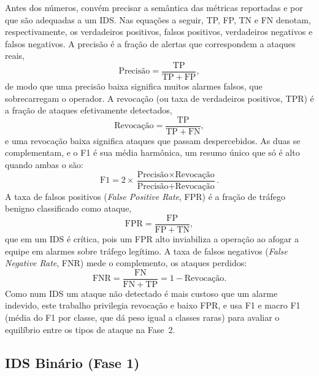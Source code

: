 \documentclass[12pt]{article}
\begin{document}
Antes dos números, convém precisar a semântica das métricas reportadas e por que
são adequadas a um IDS. Nas equações a seguir, TP, FP, TN e FN denotam,
respectivamente, os verdadeiros positivos, falsos positivos, verdadeiros
negativos e falsos negativos. A precisão é a fração de alertas que correspondem
a ataques reais,
\begin{equation}
\text{Precisão} = \frac{\mathrm{TP}}{\mathrm{TP} + \mathrm{FP}},
\label{eq:precisao}
\end{equation}
de modo que uma precisão baixa significa muitos alarmes falsos, que
sobrecarregam o operador. A revocação (ou taxa de verdadeiros positivos, TPR) é
a fração de ataques efetivamente detectados,
\begin{equation}
\text{Revocação} = \frac{\mathrm{TP}}{\mathrm{TP} + \mathrm{FN}},
\label{eq:revocacao}
\end{equation}
e uma revocação baixa significa ataques que passam despercebidos. As duas se
complementam, e o F1 é sua média harmônica, um resumo único que só é alto quando
ambas o são:
\begin{equation}
\mathrm{F1} = 2 \times \frac{\text{Precisão} \times \text{Revocação}}{\text{Precisão} + \text{Revocação}}.
\label{eq:f1}
\end{equation}
A taxa de falsos positivos (\textit{False Positive Rate}, FPR) é a fração de
tráfego benigno classificado como ataque,
\begin{equation}
\mathrm{FPR} = \frac{\mathrm{FP}}{\mathrm{FP} + \mathrm{TN}},
\label{eq:fpr}
\end{equation}
que em um IDS é crítica, pois um FPR alto inviabiliza a operação ao afogar a
equipe em alarmes sobre tráfego legítimo. A taxa de falsos negativos
(\textit{False Negative Rate}, FNR) mede o complemento, os ataques perdidos:
\begin{equation}
\mathrm{FNR} = \frac{\mathrm{FN}}{\mathrm{FN} + \mathrm{TP}} = 1 - \text{Revocação}.
\label{eq:fnr}
\end{equation}
Como num IDS um ataque não detectado é mais custoso que um alarme indevido, este
trabalho privilegia revocação e baixo FPR, e usa F1 e macro F1 (média do
F1 por classe, que dá peso igual a classes raras) para avaliar o equilíbrio entre
os tipos de ataque na Fase~2.

\subsection{IDS Binário (Fase 1)}
\label{subsec:res_bin}
\end{document}
